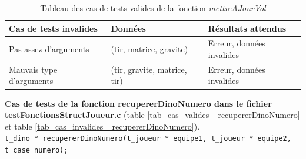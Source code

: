 \documentclass[11pt,a4paper]{article}
\begin{document}
\begin{table}[H]
    \centering
    \small
    \begin{tabularx}{\textwidth}{|
    >{\centering\arraybackslash}p{3.5cm}|
    >{\centering\arraybackslash}X|
    >{\centering\arraybackslash}p{4cm}|} \hline
        \textbf{Cas de tests invalides} & \textbf{Données} & \textbf{Résultats attendus}\\ \hline
        Pas assez d'arguments & (tir, matrice, gravite) & Erreur, données invalides \\ \hline
        Mauvais type d'arguments & (tir, gravite, matrice, tir) & Erreur, données invalides \\ \hline
    \end{tabularx}
    \caption{Tableau des cas de tests valides de la fonction \textit{\mbox{mettreAJourVol}}}
    \label{tab_cas_invalides_mettreAJourVol}
\end{table}
\newpage
\textbf{Cas de tests de la fonction recupererDinoNumero dans le fichier testFonctionsStructJoueur.c}
(table \ref{tab_cas_valides_ recupererDinoNumero} et table \ref{tab_cas_invalides_ recupererDinoNumero}).\\
\texttt{t\_dino * recupererDinoNumero(t\_joueur * equipe1, t\_joueur * equipe2, t\_case numero);}
\end{document}
